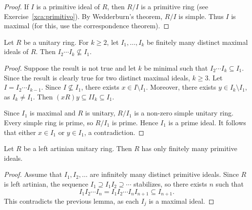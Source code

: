 \begin{proof}
    If $I$ is a primitive ideal of $R$, then $R/I$ is a primitive ring
    (see Exercise~\ref{xca:primitivo}). By Wedderburn's theorem, $R/I$ is
    simple. Thus $I$ is maximal (for this, use the correspondence theorem).
\end{proof}

\begin{lemma}
\label{lem:I2...In}
    Let $R$ be a unitary ring.
    For $k\geq2$, let $I_1,\dots,I_k$ be finitely many distinct maximal ideals of $R$. 
    Then $I_2\cdots I_k\not\subseteq I_1$.   
\end{lemma}

\begin{proof}
    Suppose the result is not true and let $k$ be minimal
    such that $I_2\cdots I_k\subseteq I_1$. Since the result is clearly
    true for two distinct maximal ideals, $k\geq3$. Let $I=I_2\cdots I_{k-1}$. 
    Since $I\not\subseteq I_1$, there exists $x\in I\setminus I_1$. Moreover,  
    there exists $y\in I_k\setminus I_1$, as 
    $I_k\ne I_1$. 
    Then 
    $(xR)y\subseteq II_k\subseteq I_1$. 
    
    Since $I_1$ is maximal and $R$ is unitary, $R/I_1$ is
    a non-zero simple unitary ring. Every simple ring is prime,
    so $R/I_1$ is prime. Hence $I_1$ is a prime ideal.
    It follows that either $x\in I_1$ or $y\in I_1$, a contradiction.   
\end{proof}


\begin{lemma}
\label{lem:Rartinian_finite_primitives}
    Let $R$ be a left artinian unitary ring. Then $R$ has only 
    finitely many primitive ideals.
\end{lemma}

\begin{proof}
    Assume that $I_1,I_2,\dots$ are infinitely many distinct primitive ideals. 
    Since $R$ is left artinian, the sequence 
    $I_1\supseteq I_1I_2\supseteq\cdots$ stabilizes, so there
    exists $n$ such that 
    \[
    I_1I_2\cdots I_n=I_1I_2\cdots I_nI_{n+1}\subseteq I_{n+1}.
    \]
    This contradicts the previous lemma, 
    as each $I_j$ is a maximal ideal. 
\end{proof}

